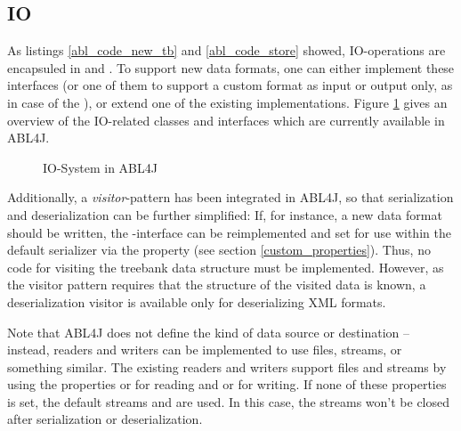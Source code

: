 \documentclass[12pt,a4paper]{article}
\newcommand{\code}[1]{{\ttfamily\selectfont{#1}}}
\begin{document}
\subsection{IO}

As listings \ref{abl_code_new_tb} and \ref{abl_code_store} showed,
IO-operations are encapsuled in \code{ITreebankReader} and
\code{ITreebankWriter}. To support new data formats, one can either implement
these interfaces (or one of them to support a custom format as input or output only,
as in case of the \code{TigerCorpusReader}), or extend one of the existing
implementations. Figure \ref{io_img} gives an overview of the IO-related
classes and interfaces which are currently available in ABL4J. 

\begin{figure}
  \centering
  \caption{IO-System in ABL4J}
  \label{io_img} 
\end{figure} 

Additionally, a
\emph{visitor}-pattern has been integrated in ABL4J, so that serialization
and deserialization can be further simplified: If, for instance, a new data
format should be written, the \code{ISerializationVisitor}-interface can be
reimplemented and set for use within the default serializer via the
\code{serialization.visitor} property (see section \ref{custom_properties}).
Thus, no code for visiting the treebank data structure must be implemented.
However, as the visitor pattern requires that the structure of the visited
data is known, a deserialization visitor is available only for deserializing
XML formats.

Note that ABL4J does not define the kind of data source or destination --
instead, readers and writers can be implemented to use files, streams, or something similar.
The existing readers and writers support files and streams by using the
properties \code{input.file} or \code{input.stream} for reading and
\code{output.file} or \code{output.stream} for writing. If none of these
properties is set, the default streams \code{System.in} and \code{System.out} are
used. In this case, the streams won't be closed after serialization or
deserialization.
\end{document}
